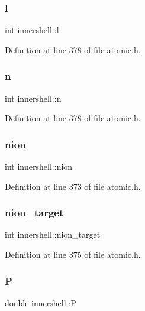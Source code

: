 \subsubsection{\texorpdfstring{l}{l}}
{\footnotesize\ttfamily int innershell\+::l}



Definition at line 378 of file atomic.\+h.

\mbox{\label{structinnershell_a2ea1f581a77ccb06023b035e150b602d}} 
\subsubsection{\texorpdfstring{n}{n}}
{\footnotesize\ttfamily int innershell\+::n}



Definition at line 378 of file atomic.\+h.

\mbox{\label{structinnershell_a9370572876071e35ac4fda3f7df21db8}} 
\subsubsection{\texorpdfstring{nion}{nion}}
{\footnotesize\ttfamily int innershell\+::nion}



Definition at line 373 of file atomic.\+h.

\mbox{\label{structinnershell_a2e3b6defa68f40ea8c3c38b68cb0c8cb}} 
\subsubsection{\texorpdfstring{nion\+\_\+target}{nion\_target}}
{\footnotesize\ttfamily int innershell\+::nion\+\_\+target}



Definition at line 375 of file atomic.\+h.

\mbox{\label{structinnershell_aa735df41855456a9a6b77908498e02e3}} 
\subsubsection{\texorpdfstring{P}{P}}
{\footnotesize\ttfamily double innershell\+::P}



